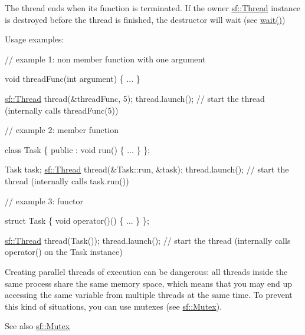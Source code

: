 The thread ends when its function is terminated. If the owner \hyperlink{classsf_1_1_thread}{sf\+::\+Thread} instance is destroyed before the thread is finished, the destructor will wait (see \hyperlink{classsf_1_1_thread_a724b1f94c2d54f84280f2f78bde95fa0}{wait()})

Usage examples\+: 
\begin{DoxyCode}
\textcolor{comment}{// example 1: non member function with one argument}

\textcolor{keywordtype}{void} threadFunc(\textcolor{keywordtype}{int} argument)
\{
    ...
\}

\hyperlink{classsf_1_1_thread}{sf::Thread} thread(&threadFunc, 5);
thread.launch(); \textcolor{comment}{// start the thread (internally calls threadFunc(5))}
\end{DoxyCode}



\begin{DoxyCode}
\textcolor{comment}{// example 2: member function}

\textcolor{keyword}{class }Task
\{
\textcolor{keyword}{public} :
    \textcolor{keywordtype}{void} run()
    \{
        ...
    \}
\};

Task task;
\hyperlink{classsf_1_1_thread}{sf::Thread} thread(&Task::run, &task);
thread.launch(); \textcolor{comment}{// start the thread (internally calls task.run())}
\end{DoxyCode}



\begin{DoxyCode}
\textcolor{comment}{// example 3: functor}

\textcolor{keyword}{struct }Task
\{
    \textcolor{keywordtype}{void} operator()()
    \{
        ...
    \}
\};

\hyperlink{classsf_1_1_thread}{sf::Thread} thread(Task());
thread.launch(); \textcolor{comment}{// start the thread (internally calls operator() on the Task instance)}
\end{DoxyCode}


Creating parallel threads of execution can be dangerous\+: all threads inside the same process share the same memory space, which means that you may end up accessing the same variable from multiple threads at the same time. To prevent this kind of situations, you can use mutexes (see \hyperlink{classsf_1_1_mutex}{sf\+::\+Mutex}).

\begin{DoxySeeAlso}{See also}
\hyperlink{classsf_1_1_mutex}{sf\+::\+Mutex} 
\end{DoxySeeAlso}


